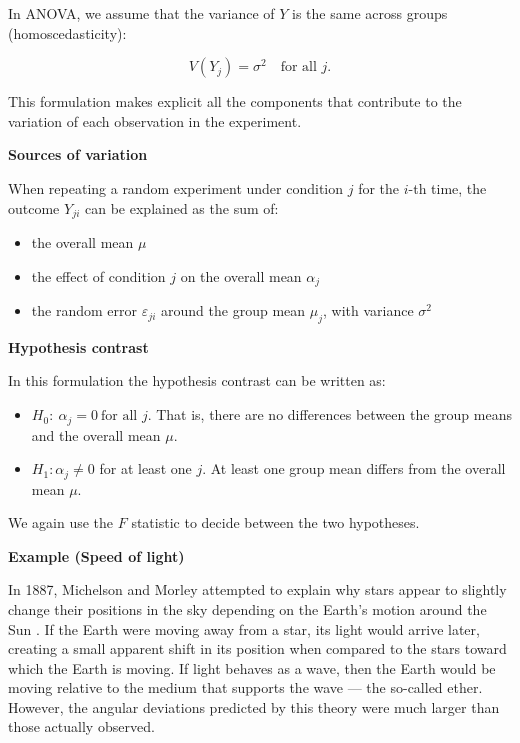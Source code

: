 \documentclass[
]{book}
\providecommand{\tightlist}{%
  \setlength{\itemsep}{0pt}\setlength{\parskip}{0pt}}
\begin{document}
In ANOVA, we assume that the variance of \(Y\) is the same across groups (homoscedasticity):

\[V(Y_j)=\sigma^2 \quad \text{for all } j.\]

This formulation makes explicit all the components that contribute to the variation of each observation in the experiment.

\textbf{Sources of variation}

When repeating a random experiment under condition \(j\) for the \(i\)-th time, the outcome \(Y_{ji}\) can be explained as the sum of:

\begin{itemize}
\tightlist
\item
  the overall mean \(\mu\)\\
\item
  the effect of condition \(j\) on the overall mean \(\alpha_j\)\\
\item
  the random error \(\varepsilon_{ji}\) around the group mean \(\mu_j\), with variance \(\sigma^2\)
\end{itemize}

\textbf{Hypothesis contrast}

In this formulation the hypothesis contrast can be written as:

\begin{itemize}
\tightlist
\item
  \(H_0:\ \alpha_j=0 \ \text{for all } j\). That is, there are no differences between the group means and the overall mean \(\mu\).\\
\item
  \(H_1: \alpha_j \neq 0\) for at least one \(j\). At least one group mean differs from the overall mean \(\mu\).
\end{itemize}

We again use the \(F\) statistic to decide between the two hypotheses.

\textbf{Example (Speed of light)}

In 1887, Michelson and Morley attempted to explain why stars appear to slightly change their positions in the sky depending on the Earth's motion around the Sun \citep{michelson1887ether}. If the Earth were moving away from a star, its light would arrive later, creating a small apparent shift in its position when compared to the stars toward which the Earth is moving. If light behaves as a wave, then the Earth would be moving relative to the medium that supports the wave --- the so-called ether. However, the angular deviations predicted by this theory were much larger than those actually observed.
\end{document}
